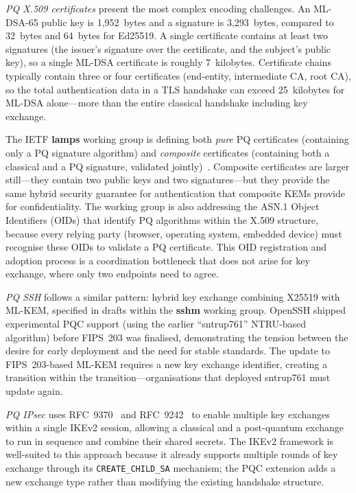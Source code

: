 \emph{PQ X.509 certificates} present the most complex encoding challenges. An ML-DSA-65 public key is 1,952~bytes and a signature is 3,293~bytes, compared to 32~bytes and 64~bytes for Ed25519. A single certificate contains at least two signatures (the issuer's signature over the certificate, and the subject's public key), so a single ML-DSA certificate is roughly 7~kilobytes. Certificate chains typically contain three or four certificates (end-entity, intermediate CA, root CA), so the total authentication data in a TLS handshake can exceed 25~kilobytes for ML-DSA alone---more than the entire classical handshake including key exchange.

The IETF \textbf{lamps} working group is defining both \emph{pure} PQ certificates (containing only a PQ signature algorithm) and \emph{composite} certificates (containing both a classical and a PQ signature, validated jointly)~\cite{SiegelThalheim2023}. Composite certificates are larger still---they contain two public keys and two signatures---but they provide the same hybrid security guarantee for authentication that composite KEMs provide for confidentiality. The working group is also addressing the ASN.1 Object Identifiers (OIDs) that identify PQ algorithms within the X.509 structure, because every relying party (browser, operating system, embedded device) must recognise these OIDs to validate a PQ certificate. This OID registration and adoption process is a coordination bottleneck that does not arise for key exchange, where only two endpoints need to agree.

\emph{PQ SSH} follows a similar pattern: hybrid key exchange combining X25519 with ML-KEM, specified in drafts within the \textbf{sshm} working group. OpenSSH shipped experimental PQC support (using the earlier ``sntrup761'' NTRU-based algorithm) before FIPS~203 was finalised, demonstrating the tension between the desire for early deployment and the need for stable standards. The update to FIPS~203-based ML-KEM requires a new key exchange identifier, creating a transition within the transition---organisations that deployed sntrup761 must update again.

\emph{PQ IPsec} uses RFC~9370~\cite{RFC9370} and RFC~9242~\cite{RFC9242} to enable multiple key exchanges within a single IKEv2 session, allowing a classical and a post-quantum exchange to run in sequence and combine their shared secrets. The IKEv2 framework is well-suited to this approach because it already supports multiple rounds of key exchange through its \texttt{CREATE\_CHILD\_SA} mechanism; the PQC extension adds a new exchange type rather than modifying the existing handshake structure.

